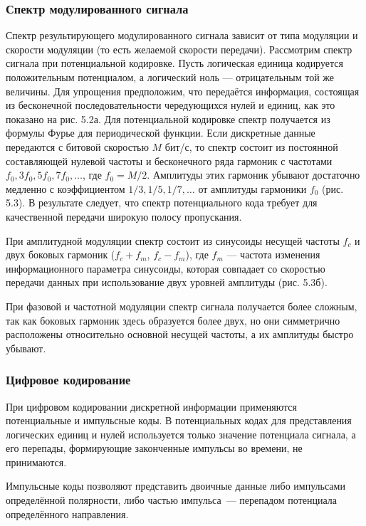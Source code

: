 \documentclass[
	a4paper,
	oneside,
	BCOR = 10mm,
	DIV = 12,
	12pt,
	headings = normal,
]{scrartcl}
\begin{document}
				\subsubsection{Спектр модулированного сигнала}
					Спектр результирующего модулированного сигнала зависит от типа модуляции и скорости модуляции (то есть желаемой скорости передачи). Рассмотрим спектр сигнала при потенциальной кодировке. Пусть логическая единица кодируется положительным потенциалом, а логический ноль — отрицательным той же величины. Для упрощения предположим, что передаётся информация, состоящая из бесконечной последовательности чередующихся нулей и единиц, как это показано на рис. 5.2а. Для потенциальной кодировке спектр получается из формулы Фурье для периодической функции. Если дискретные данные передаются с битовой скоростью $M$ бит/с, то спектр состоит из постоянной составляющей нулевой частоты и бесконечного ряда гармоник с частотами $f_0, 3f_0, 5f_0, 7f_0, \dots$, где $f_0 = M / 2$. Амплитуды этих гармоник убывают достаточно медленно с коэффициентом $1/3, 1/5, 1/7, \dots$ от амплитуды гармоники $f_0$ (рис. 5.3). В результате следует, что спектр потенциального кода требует для качественной передачи широкую полосу пропускания.

					При амплитудной модуляции спектр состоит из синусоиды несущей частоты $f_c$ и двух боковых гармоник ($f_c + f_m$, $f_c - f_m$),  где $f_m$ — частота изменения информационного параметра синусоиды, которая совпадает со скоростью передачи данных при использование двух уровней амплитуды (рис. 5.3б). 

					При фазовой и частотной модуляции спектр сигнала получается более сложным, так как боковых гармоник здесь образуется более двух, но они симметрично расположены относительно основной несущей частоты, а их амплитуды быстро убывают.

				\subsubsection{Цифровое кодирование}
					При цифровом кодировании дискретной информации применяются потенциальные и импульсные коды. В потенциальных кодах для представления логических единиц и нулей используется только значение потенциала сигнала, а его перепады, формирующие законченные импульсы во времени, не принимаются. 

					Импульсные коды позволяют представить двоичные данные либо импульсами определённой полярности, либо частью импульса~— перепадом потенциала определённого направления. 
\end{document}
